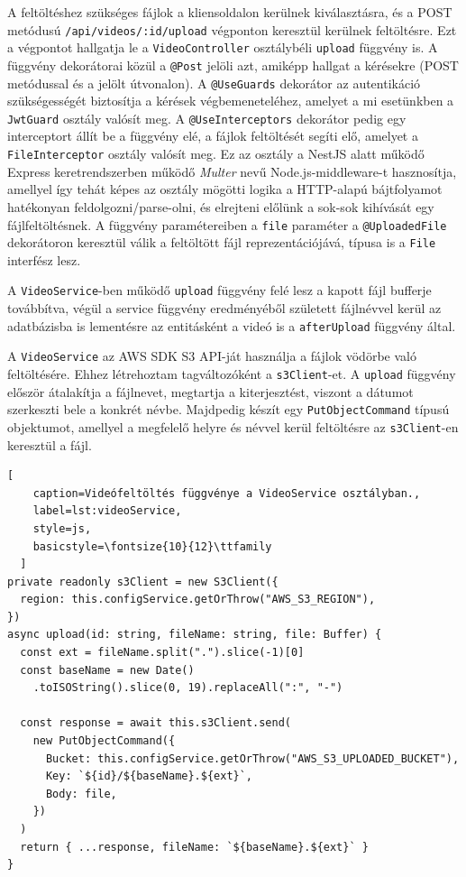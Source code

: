 A feltöltéshez szükséges fájlok a kliensoldalon kerülnek kiválasztásra, és a POST metódusú \verb|/api/videos/:id/upload| végponton keresztül kerülnek feltöltésre. Ezt a végpontot hallgatja le a \verb|VideoController| osztálybéli \verb|upload| függvény is. A függvény dekorátorai közül a \verb|@Post| jelöli azt, amiképp hallgat a kérésekre (POST metódussal és a jelölt útvonalon). A \verb|@UseGuards| dekorátor az autentikáció szükségességét biztosítja a kérések végbemeneteléhez, amelyet a mi esetünkben a \verb|JwtGuard| osztály valósít meg. A \verb|@UseInterceptors| dekorátor pedig egy interceptort állít be a függvény elé, a fájlok feltöltését segíti elő, amelyet a \verb|FileInterceptor| osztály valósít meg. Ez az osztály a NestJS alatt működő Express keretrendszerben működő \emph{Multer} nevű Node.js-middleware-t hasznosítja, amellyel így tehát képes az osztály mögötti logika a HTTP-alapú bájtfolyamot hatékonyan feldolgozni/parse-olni, és elrejteni előlünk a sok-sok kihívását egy fájlfeltöltésnek. A függvény paramétereiben a \verb|file| paraméter a \verb|@UploadedFile| dekorátoron keresztül válik a feltöltött fájl reprezentációjává, típusa is a \verb|File| interfész lesz.

A \verb|VideoService|-ben működő \verb|upload| függvény felé lesz a kapott fájl bufferje továbbítva, végül a service függvény eredményéből született fájlnévvel kerül az adatbázisba is lementésre az entitásként a videó is a \verb|afterUpload| függvény által.

A \verb|VideoService| az AWS SDK S3 API-ját használja a fájlok vödörbe való feltöltésére. Ehhez létrehoztam tagváltozóként a \verb|s3Client|-et. A \verb|upload| függvény először átalakítja a fájlnevet, megtartja a kiterjesztést, viszont a dátumot szerkeszti bele a konkrét névbe. Majdpedig készít egy \verb|PutObjectCommand| típusú objektumot, amellyel a megfelelő helyre és névvel kerül feltöltésre az \verb|s3Client|-en keresztül a fájl.

\begin{minipage}{0.92\textwidth}
  \begin{lstlisting}[
    caption=Videófeltöltés függvénye a VideoService osztályban.,
    label=lst:videoService,
    style=js,
    basicstyle=\fontsize{10}{12}\ttfamily
  ]
private readonly s3Client = new S3Client({
  region: this.configService.getOrThrow("AWS_S3_REGION"),
})
async upload(id: string, fileName: string, file: Buffer) {
  const ext = fileName.split(".").slice(-1)[0]
  const baseName = new Date()
    .toISOString().slice(0, 19).replaceAll(":", "-")

  const response = await this.s3Client.send(
    new PutObjectCommand({
      Bucket: this.configService.getOrThrow("AWS_S3_UPLOADED_BUCKET"),
      Key: `${id}/${baseName}.${ext}`,
      Body: file,
    })
  )
  return { ...response, fileName: `${baseName}.${ext}` }
}
\end{lstlisting}
\end{minipage}

